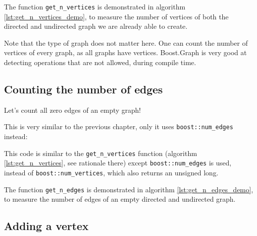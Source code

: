 The function \verb;get_n_vertices; is demonstrated in algorithm 
\ref{lst:get_n_vertices_demo}, 
to measure the number of vertices of both the directed and undirected
graph we are already able to create.



Note that the type of graph does not matter here.
One can count the number of vertices of every graph, as all graphs have
vertices.
Boost.Graph is very good at detecting operations that are not allowed, during
compile time.

\subsection{Counting the number of edges}
\label{subsec:get_n_edges}

Let's count all zero edges of an empty graph!

This is very similar to the previous chapter, 
only it uses \verb;boost::num_edges; 
instead:



This code is similar to the \verb;get_n_vertices; 
function (algorithm \ref{lst:get_n_vertices}, see rationale there) 
except \verb;boost::num_edges; 
is used, instead of \verb;boost::num_vertices;, 
which also returns an unsigned long.

The function \verb;get_n_edges; is demonstrated in algorithm 
\ref{lst:get_n_edges_demo}, 
to measure the number of edges of an empty directed and undirected graph.



\subsection{Adding a vertex}
\label{subsec:add_vertex}

